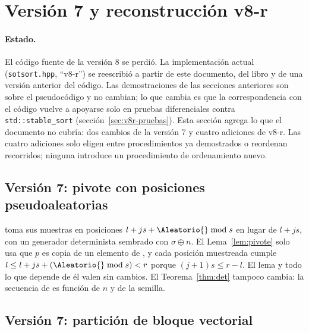 \section{Versión 7 y reconstrucción v8-r}\label{sec:v8r}

\paragraph{Estado.} El código fuente de la versión 8 se perdió. La implementación
actual (\texttt{sotsort.hpp}, ``v8-r'') se reescribió a partir de este documento, del
libro y de una versión anterior del código. Las demostraciones de las secciones
anteriores son sobre el pseudocódigo y no cambian; lo que cambia es que la
correspondencia con el código vuelve a apoyarse solo en pruebas diferenciales contra
\texttt{std::stable\_sort} (sección~\ref{sec:v8r-pruebas}). Esta sección agrega lo que
el documento no cubría: dos cambios de la versión 7 y cuatro adiciones de v8-r. Las
cuatro adiciones solo eligen entre procedimientos ya demostrados o reordenan
recorridos; ninguna introduce un procedimiento de ordenamiento nuevo.

\subsection{Versión 7: pivote con posiciones pseudoaleatorias}
\Pivote toma sus muestras en posiciones $l+js+\Aleatorio{}\bmod s$ en lugar de $l+js$,
con un generador determinista sembrado con $\sigma\oplus n$. El Lema~\ref{lem:pivote}
solo usa que $p$ es copia de un elemento de , y cada posición muestreada
cumple $l\le l+js+(\Aleatorio{}\bmod s)<r$ porque $(j+1)s\le r-l$. El lema y todo lo que
depende de él valen sin cambios. El Teorema~\ref{thm:det} tampoco cambia: la secuencia de
\Aleatorio es función de $n$ y de la semilla.

\subsection{Versión 7: partición de bloque vectorial}

\begin{algorithm}[H]
\caption{Partición de bloque vectorial, con $w$ carriles}\label{alg:partvec}
\Fn{\PartVec{$s, e, p, \triangleleft$}}{
  $m\gets 0$;\quad $i\gets 0$\;
  \While{$i+w\le L$}{
    $X\gets A[s+i\,..\,s+i+w)$\tcp*{una carga}
    $k\gets\{\,j<w : X[j]\triangleleft p\,\}$\;
    $A[s+m\,..\,s+m+w)\gets\mathrm{comprimir}(X,k)$\;
    $\buf[i-m\,..\,i-m+w)\gets\mathrm{comprimir}(X,\overline{k})$\;
    $m\gets m+|k|$;\quad $i\gets i+w$\;
  }
  cola escalar: el lazo de \PartBloque desde $i$\;
  $A[s+m\,..\,e)\gets\buf[0\,..\,L-m)$;\quad \KwRet $s+m$\;
}
\end{algorithm}

